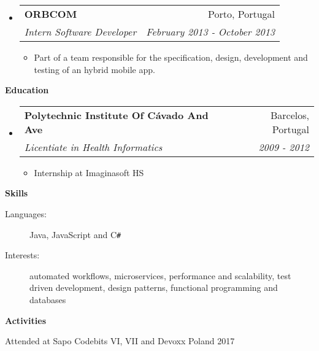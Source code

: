 \documentclass[letterpaper,11pt]{article}
\makeatletter
\newcommand{\resitem}[1]{\item #1 \vspace{-2pt}}
\newcommand{\resheading}[1]{{\large \colorbox{mygrey}{\begin{minipage}{\textwidth}{\textbf{#1 \vphantom{p\^{E}}}}\end{minipage}}}}
\newcommand{\ressubheading}[4]{
	\begin{tabular*}{7.0in}{l@{\extracolsep{\fill}}r}
		\textbf{#1} & #2 \\
		\textit{#3} & \textit{#4} \\
	\end{tabular*}\vspace{-6pt}}
\makeatother
\begin{document}
\begin{itemize}
		\vspace{0.05in}
		
		\item
		\ressubheading{ORBCOM}{Porto, Portugal}{Intern Software Developer}{February 2013 - October 2013}
		\begin{itemize}
			\resitem{Part of a team responsible for the specification, design, development and testing of an hybrid mobile app.}
		\end{itemize}

	\end{itemize}

\resheading{Education}
	\begin{itemize}
		\item
		\ressubheading{Polytechnic Institute Of C\'avado And Ave}{Barcelos, Portugal}{Licentiate in Health Informatics}{2009 - 2012}
		\begin{itemize}
			\resitem{Internship at Imaginasoft HS}
		\end{itemize}
		
	\end{itemize}
	
	
	\resheading{Skills}
	
	\begin{description}
		\item[Languages:]
		Java, JavaScript and C{}\verb!#!
		\item[Interests:]
		automated workflows, microservices, performance and scalability, test driven development, design patterns, functional programming and databases
	\end{description}	
	
	\resheading{Activities}
	
	\begin{description}
		\item[Attended at Sapo Codebits VI, VII and Devoxx Poland 2017]
	\end{description}
	
\end{document}
